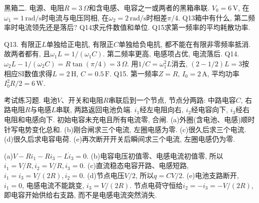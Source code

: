 \begin{exercise}
黑箱二. 电源、电阻$R=3\,\Omega$和含电感、电容之一或两者的黑箱串联. $V_0=6\,\mathrm V$, 在$\omega_1=1\,\mathrm{rad/s}$时电流与电压同相, 在$\omega_2=2\,\mathrm{rad/s}$时相差$\pi/4$.
Q13箱中有什么, 第二频率时电流领先还是落后? Q14求元件数值和单位. Q15求第一频率的平均耗散功率.
\end{exercise}
\begin{solution}
Q13. 有限正$L$单独给正电抗, 有限正$C$单独给负电抗, 都不能在有限非零频率抵消. 故两者都有, 且$\omega_1L=1/(\omega_1C)$. 第二频率更高, 电感项占优, 电流落后.
Q14. $\omega_2L-1/(\omega_2C)=R\tan(\pi/4)=3\,\Omega$. 用$1/C=\omega_1^2L$消去, $(2-1/2)L=3$按相应SI数值求得$L=2\,\mathrm H$, $C=0.5\,\mathrm F$.
Q15. 第一频率$Z=R$, $I_0=2\,\mathrm A$, 平均功率$I_0^2R/2=6\,\mathrm W$.
\end{solution}

\begin{exercise}
考试练习题. 电池$V$、开关和电阻$R$串联后到一个节点, 节点分两路: 中路电容$C$, 右路电阻$R$与电感$L$串联, 两路返回电池负端. $i_1$经左电阻向右, $i_2$经电容向下, $i_3$经右电阻和电感向下. 初始电容未充电且所有电流零, 合闸.
(a)外圈(含电池、电感)顺时针写电势变化总和.
(b)刚合闸求三个电流, 左圈电感为零.
(c)很久后求三个电流.
(d)很久后求电容电荷.
(e)再次断开开关后瞬间求三个电流, 左圈电感仍为零.
\end{exercise}
\begin{solution}
(a)$V-Ri_1-Ri_3-L\dot i_3=0$.
(b)电容电压初值零、电感电流初值零, 所以$i_1=V/R,i_2=V/R,i_3=0$.
(c)直流稳态电容开路、电感短路, $i_1=i_3=V/(2R),i_2=0$.
(d)节点电压$V/2$, 所以$q=CV/2$.
(e)电池支路断开,$i_1=0$, 电感电流不能跳变, $i_3=V/(2R)$. 节点电荷守恒给$i_2=-i_3=-V/(2R)$, 即电容开始供给右支路, 而不是电感电流突然消失.
\end{solution}
